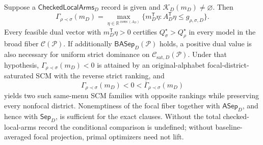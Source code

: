 Suppose a \(\mathsf{CheckedLocalArms}_D\) record is given and \(\mathcal K_D(m_D)\ne\varnothing\).  Then
\[
\Gamma_{\rho\prec\sigma}(m_D)=
\max_{\eta\in\mathbb R^{\operatorname{rows}(A_D)}}
\{m_D^{\mathsf T}\eta:A_D^{\mathsf T}\eta
\leq g_{\rho,\sigma,D}\}.
\]
Every feasible dual vector with \(m_D^{\mathsf T}\eta>0\) certifies \(Q_\sigma^\star>Q_\rho^\star\) in every model in the broad fiber \(\mathcal C(\mathcal P)\).  If additionally \(\mathsf{BASep}_D(\mathcal P)\) holds, a positive dual value is also necessary for uniform strict dominance on \(\mathcal C_{\mathrm{sat},D}(\mathcal P)\).  Under that hypothesis, \(\Gamma_{\rho\prec\sigma}(m_D)<0\) is attained by an original-alphabet focal-district-saturated SCM with the reverse strict ranking, and
\[
\Gamma_{\rho\prec\sigma}(m_D)<0<
\overline\Gamma_{\rho\prec\sigma}(m_D)
\]
yields two such same-menu SCM families with opposite rankings while preserving every nonfocal district.  Nonemptiness of the focal fiber together with \(\mathsf{ASep}_D\), and hence with \(\mathsf{Sep}_D\), is sufficient for the exact clauses.  Without the total checked-local-arms record the conditional comparison is undefined; without baseline-averaged focal projection, primal optimizers need not lift.